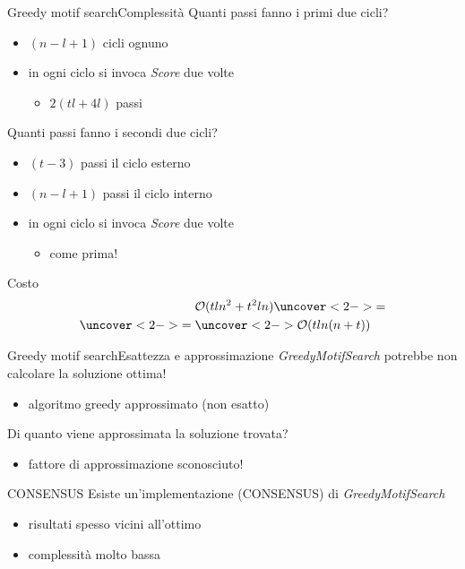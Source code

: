 	\begin{frame}{Greedy motif search}{Complessità}
		Quanti passi fanno i primi due cicli?
		\begin{itemize}
			\item $(n-l+1)$ cicli ognuno
			\item in ogni ciclo si invoca \textit{Score} due volte
			\begin{itemize}
				\item $2(tl+4l)$ passi
			\end{itemize}
		\end{itemize}
		Quanti passi fanno i secondi due cicli?
		\begin{itemize}
			\item $(t-3)$ passi il ciclo esterno
			\item $(n-l+1)$ passi il ciclo interno
			\item in ogni ciclo si invoca \textit{Score} due volte
			\begin{itemize}
				\item come prima!
			\end{itemize}
		\end{itemize}
		\begin{center}
			\begin{minipage}{4cm}		
				\begin{varblock}{Costo}
					\begin{align*}
						&\mathcal{O}(tln^2 + t^2ln) \uncover<2->{=}\\
						\uncover<2->{=\;} & \uncover<2->{\mathcal{O}(tln(n+t))}\\
					\end{align*}
				\end{varblock}
			\end{minipage}
		\end{center}
	\end{frame}
	
	\begin{frame}{Greedy motif search}{Esattezza e approssimazione}
		\textit{GreedyMotifSearch} potrebbe non calcolare la soluzione ottima!
		\begin{itemize}
			\item algoritmo greedy approssimato (non esatto)
		\end{itemize}
		Di quanto viene approssimata la soluzione trovata?
		\begin{itemize}
			\item fattore di approssimazione sconosciuto!
		\end{itemize}
		\begin{block}{CONSENSUS}
			Esiste un'implementazione (CONSENSUS) di \textit{GreedyMotifSearch}
			\begin{itemize}
				\item risultati spesso vicini all'ottimo
				\item complessità molto bassa
			\end{itemize}
		\end{block}
	\end{frame}
	
